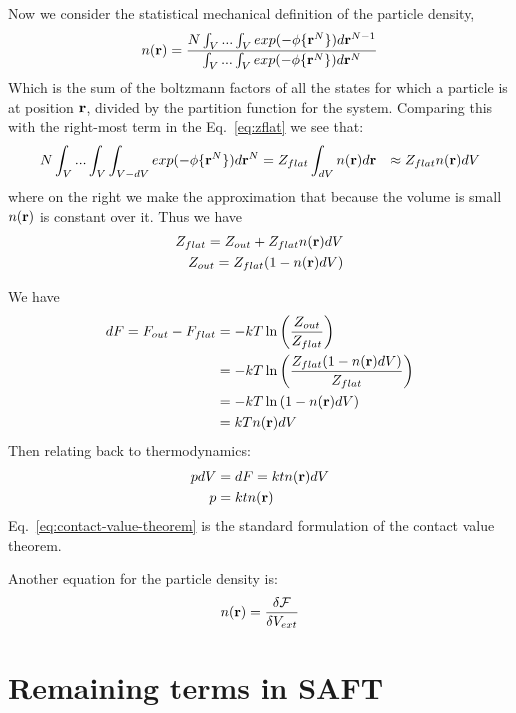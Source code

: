 Now we consider the statistical mechanical definition of the particle
density,
\begin{align}
  n(\textbf{r}) = \frac{N \int_V... \int_V exp(-\phi \{ \textbf{r}^N \})d\textbf{r}^{N-1}}{\int_V... \int_V exp(-\phi \{ \textbf{r}^N \})d\textbf{r}^N}
\end{align}
Which is the sum of the boltzmann factors of all the states for which
a particle is at position $\textbf{r}$, divided by the partition function for
the system.  Comparing this with the right-most term in the
Eq.~\ref{eq:zflat} we see that:
\begin{align}
 N \int_V... \int_V \int_{V-dV} exp(-\phi \{ \textbf{r}^N \})d\textbf{r}^N  &= Z_{flat} \int_{dV} n(\textbf{r}) d\textbf{r}
 &\approx Z_{flat} n(\textbf{r})dV
\end{align}
where on the right we make the approximation that because the volume
is small $n(\textbf{r})$ is constant over it.
Thus we have
\begin{align}
Z_{flat} = Z_{out} + Z_{flat} n(\textbf{r})dV \\
Z_{out} = Z_{flat} (1-n(\textbf{r})dV)
\end{align}

We have
\begin{align}
  dF = F_{out} - F_{flat} &= -kT \ln \left( \frac{Z_{out}}{Z_{flat}} \right) \notag \\
  &= -kT \ln \left( \frac{Z_{flat} (1-n(\textbf{r})dV)}{Z_{flat}} \right) \notag \\
  &= -kT \ln \left( 1-n(\textbf{r})dV \right) \notag \\
  &= kTn(\textbf{r})dV
\end{align}
Then relating back to thermodynamics:
\begin{align}
  pdV &= dF = ktn(\textbf{r})dV \\
  \label{eq:contact-value-theorem}
  p &= ktn(\textbf{r})
\end{align}
Eq.~\ref{eq:contact-value-theorem} is the standard formulation of the
contact value theorem.


Another equation for the particle density is:
\begin{align}
n(\textbf{r}) = \frac{\delta \mathcal{F}}{\delta V_{ext}}
\end{align}

\clearpage
\newpage




\section{Remaining terms in SAFT}
